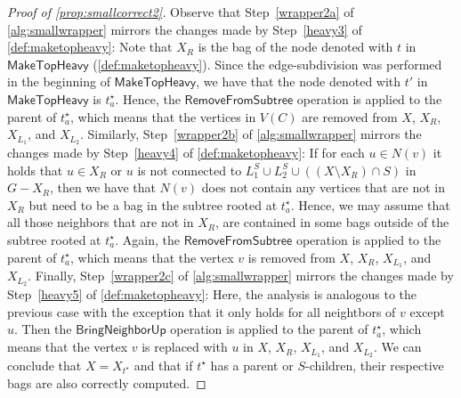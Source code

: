 \documentclass[a4paper,UKenglish,cleveref, autoref, thm-restate, numberwithinsect]{lipics-v2021}
\newcommand{\RemoveFromSubtree}{\mathsf{RemoveFromSubtree}}
\newcommand{\BringNeighborUp}{\mathsf{BringNeighborUp}}
\newcommand{\MakeTopHeavy}{\mathsf{MakeTopHeavy}}
\begin{document}
\begin{proof}[Proof of \cref{prop:smallcorrect2}]
Observe that Step~\ref{wrapper2a} of \cref{alg:smallwrapper} mirrors the changes made by Step~\ref{heavy3} of \cref{def:maketopheavy}:
Note that $X_R$ is the bag of the node denoted with $t$ in $\MakeTopHeavy$ (\cref{def:maketopheavy}). Since the edge-subdivision was performed in the beginning of $\MakeTopHeavy$, we have that the node denoted with $t'$ in $\MakeTopHeavy$ is $t^\star_a$. Hence, the $\RemoveFromSubtree$ operation is applied to the parent of $t^\star_a$, which means that the vertices in $V(C)$ are removed from $X$, $X_R$, $X_{L_1}$, and $X_{L_2}$.
Similarly, Step~\ref{wrapper2b} of \cref{alg:smallwrapper} mirrors the changes made by Step~\ref{heavy4} of \cref{def:maketopheavy}:
If for each $u\in N(v)$ it holds that $u\in X_R$ or $u$ is not connected to $L_1^S\cup L_2^S\cup((X\setminus X_R)\cap S)$ in $G-X_R$, then we have that $N(v)$ does not contain any vertices that are not in $X_R$ but need to be a bag in the subtree rooted at $t^\star_a$. Hence, we may assume that all those neighbors that are not in $X_R$, are contained in some bags outside of the subtree rooted at $t^\star_a$. Again, the $\RemoveFromSubtree$ operation is applied to the parent of $t^\star_a$, which means that the vertex $v$ is removed from $X$, $X_R$, $X_{L_1}$, and $X_{L_2}$.
Finally, Step~\ref{wrapper2c} of \cref{alg:smallwrapper} mirrors the changes made by Step~\ref{heavy5} of \cref{def:maketopheavy}:
Here, the analysis is analogous to the previous case with the exception that it only holds for all neightbors of $v$ except $u$. Then the $\BringNeighborUp$ operation is applied to the parent of $t^\star_a$, which means that the vertex $v$ is replaced with $u$ in $X$, $X_R$, $X_{L_1}$, and $X_{L_2}$.
We can conclude that $X=X_{t^{\star}}$ and that if $t^{\star}$ has a parent or $S$-children, their respective bags are also correctly computed.
\end{proof}
\end{document}
